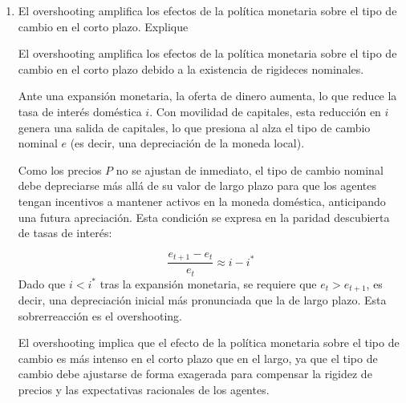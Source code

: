 \documentclass[a4paper]{article}
\begin{document}
\begin{enumerate}
\begin{solution}
        Si los precios fueran flexibles no habría ninguna sobrereacción del tipo de cambio.
    \end{solution}

    \item[e)] El overshooting amplifica los efectos de la política monetaria sobre el tipo de cambio en el corto plazo. Explique
    \begin{solution}
        El overshooting amplifica los efectos de la política monetaria sobre el tipo de cambio en el corto plazo debido a la existencia de rigideces nominales.

        Ante una expansión monetaria, la oferta de dinero aumenta, lo que reduce la tasa de interés doméstica \( i \). Con movilidad de capitales, esta reducción en \( i \) genera una salida de capitales, lo que presiona al alza el tipo de cambio nominal \( e \) (es decir, una depreciación de la moneda local).

        Como los precios \( P \) no se ajustan de inmediato, el tipo de cambio nominal debe depreciarse más allá de su valor de largo plazo para que los agentes tengan incentivos a mantener activos en la moneda doméstica, anticipando una futura apreciación. Esta condición se expresa en la paridad descubierta de tasas de interés:

\[
\frac{e_{t+1} - e_t}{e_t} \approx i - i^*
\]
        Dado que \( i < i^* \) tras la expansión monetaria, se requiere que \( e_t > e_{t+1} \), es decir, una depreciación inicial más pronunciada que la de largo plazo. Esta sobrerreacción es el overshooting.

        \begin{center}
        \end{center}

        El overshooting implica que el efecto de la política monetaria sobre el tipo de cambio es más intenso en el corto plazo que en el largo, ya que el tipo de cambio debe ajustarse de forma exagerada para compensar la rigidez de precios y las expectativas racionales de los agentes.
    \end{solution}


\end{enumerate}
\end{document}
